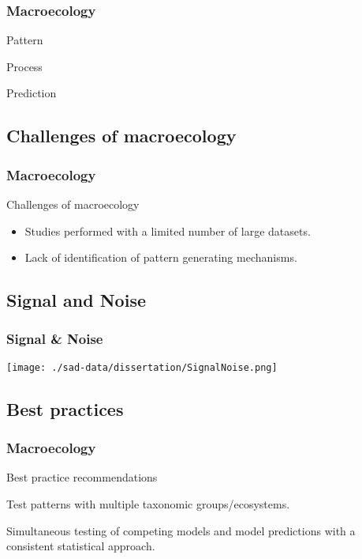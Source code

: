 \documentclass[14pt]{beamer}
\begin{document}
\begin{frame}
\frametitle{Macroecology}
\begin{Huge}
\begin{center}

Pattern 

\MVArrowDown{}  

Process  

\MVArrowDown{}
 
Prediction

\end{center}
\end{Huge}
\end{frame}

\subsection{Challenges of macroecology}
\begin{frame}[t]
\frametitle{Macroecology}
Challenges of macroecology\\
\begin{itemize}
\item Studies performed with a limited number of large datasets.
\item Lack of identification of pattern generating mechanisms.
\end{itemize}
\end{frame}

\subsection{Signal and Noise}
\begin{frame}[t]
\frametitle{Signal \& Noise}
\begin{center}
\texttt{[image: ./sad-data/dissertation/SignalNoise.png]}
\end{center}
\end{frame}


\subsection{Best practices}
\begin{frame}[t]
\frametitle{Macroecology}
Best practice recommendations\\
\begin{itemize}
\begin{small}
\item Test patterns with multiple taxonomic groups/ecosystems.  
\item Simultaneous testing of competing models and model predictions with a consistent statistical approach.
\end{small}
\end{itemize}
\end{frame}
\end{document}
